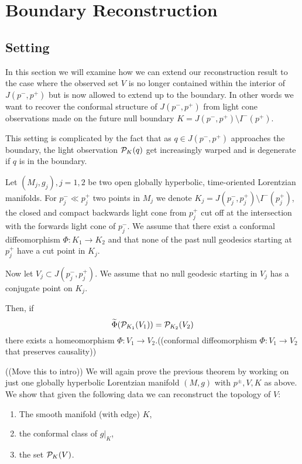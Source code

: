 \chapter{Boundary Reconstruction}

\section{Setting}

In this section we will examine how we can extend our reconstruction result to the case where the observed set $V$ is no longer contained within the interior of $J(p^-,p^+)$ but is now allowed to extend up to the boundary. In other words we want to recover the conformal structure of $J(p^-,p^+)$ from light cone observations made on the future null boundary $K = J(p^-,p^+) \setminus I^-(p^+)$.

This setting is complicated by the fact that as $q\in J(p^-,p^+)$ approaches the boundary, the light observation $\mc{P}_K(q)$ get increasingly warped and is degenerate if $q$ is in the boundary. 


\begin{theorem}\label{thm:boundaryreconstr}
    Let $(M_j,g_j), j=1,2$ be two open globally hyperbolic, time-oriented Lorentzian manifolds. For $p_j^-\ll p_j^+$ two points in $M_j$ we denote $K_j = J(p_j^-,p_j^+) \setminus I^-(p^+_j)$, the closed and compact backwards light cone from $p_j^+$ cut off at the intersection with the forwards light cone of $p_j^-$. We assume that there exist a conformal diffeomorphism $\Phi:K_1\to K_2$ and that none of the past null geodesics starting at $p_j^+$ have a cut point in $K_j$. 

    Now let $V_j\subset J(p_j^-,p_j^+)$. We assume that no null geodesic starting in $V_j$ has a conjugate point on $K_j$. 

    Then, if 
    \[
    \widetilde{\Phi}(\mc{P}_{K_1}(V_1)) = \mc{P}_{K_2}(V_2)
    \]
    there exists a homeomorphism $\Phi:V_1\to V_2$.((conformal diffeomorphism $\Phi:V_1\to V_2$ that preserves causality))
\end{theorem}

\begin{remark}
    ((Move this to intro))
    We will again prove the previous theorem by working on just one globally hyperbolic Lorentzian manifold $(M,g)$ with $p^\pm,V,K$ as above. We show that given the following data we can reconstruct the topology of $V$:

    \begin{enumerate}[label={\textnormal{(\arabic*)}}]
        \item The smooth manifold (with edge) $K$,
        \item the conformal class of $g\rvert_K$,
        \item the set $\P_K(V)$.
    \end{enumerate}
\end{remark}


